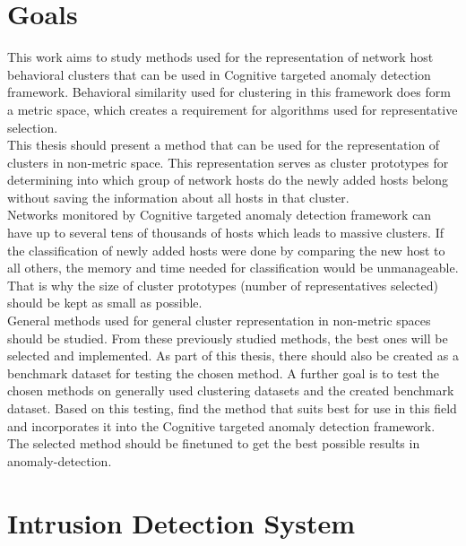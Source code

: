 \documentclass[thesis=B,english]{FITthesis}[2012/10/20]
\begin{document}
\chapter{Goals}

This work aims to study methods used for the representation of network host behavioral clusters that can be used in Cognitive targeted anomaly detection framework.
Behavioral similarity used for clustering in this framework does form a metric space, which creates a requirement for algorithms used for representative selection. \\

This thesis should present a method that can be used for the representation of clusters in non-metric space.
This representation serves as cluster prototypes for determining into which group of network hosts do the newly added hosts belong without saving the information about all hosts in that cluster. \\

Networks monitored by Cognitive targeted anomaly detection framework can have up to several tens of thousands of hosts which leads to massive clusters.
If the classification of newly added hosts were done by comparing the new host to all others, the memory and time needed for classification would be unmanageable.
That is why the size of cluster prototypes (number of representatives selected) should be kept as small as possible. \\

General methods used for general cluster representation in non-metric spaces should be studied.
From these previously studied methods, the best ones will be selected and implemented.
As part of this thesis, there should also be created as a benchmark dataset for testing the chosen method.
A further goal is to test the chosen methods on generally used clustering datasets and the created benchmark dataset.
Based on this testing, find the method that suits best for use in this field and incorporates it into the Cognitive targeted anomaly detection framework.
The selected method should be finetuned to get the best possible results in anomaly-detection. 



\chapter{Intrusion Detection System}
\end{document}
